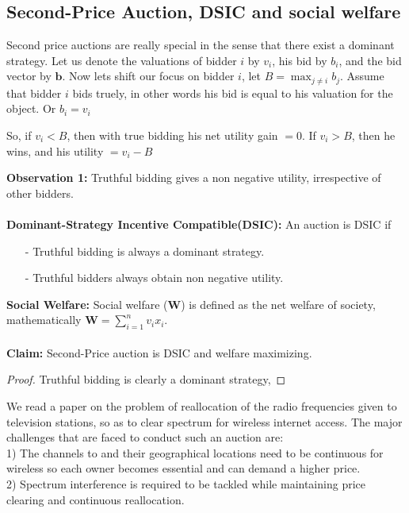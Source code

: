 \documentclass[a4paper]{article}
\begin{document}
\subsection*{Second-Price Auction, DSIC and social welfare}
Second price auctions are really special in the sense that there exist a dominant strategy. Let us denote the valuations of bidder $i$ by $v_i$, his bid by $b_i$, and the bid vector by $\mathbf{b}$. Now lets shift our focus on bidder $i$, let $B = \max_{j\ne i} b_j$. 
Assume that bidder $i$ bids truely, in other words his bid is equal to his valuation for the object. Or $b_i = v_i$

So, if $v_i < B$, then with true bidding his net utility gain $= 0$. If $v_i > B$, then he wins, and his utility $= v_i - B$

\textbf{Observation 1:} Truthful bidding gives a non negative utility, irrespective of other bidders.  \\ \\
\textbf{Dominant-Strategy Incentive Compatible(DSIC):} An auction is DSIC if
\begin{itemize}
    \item[-] Truthful bidding is always a dominant strategy.
    \item[-] Truthful bidders always obtain non negative utility.
\end{itemize}
\textbf{Social Welfare:} Social welfare ($\mathbf{W}$) is defined as the net welfare of society, mathematically $\mathbf{W} = \sum_{i=1}^{n}v_i x_i$. \\ \\
\textbf{Claim:} Second-Price auction is DSIC and welfare maximizing.
\begin{proof}
Truthful bidding is clearly a dominant strategy, 
\end{proof}


\pagebreak
We read a paper on the problem of reallocation of the radio frequencies given to television stations, so as to clear spectrum for wireless internet access. The major challenges that are faced to conduct such an auction are:\\
1) The channels to and their geographical locations need to be continuous for wireless so each owner becomes essential and can demand a higher price.\\
2) Spectrum interference is required to be tackled while maintaining price clearing and continuous reallocation.
\end{document}
